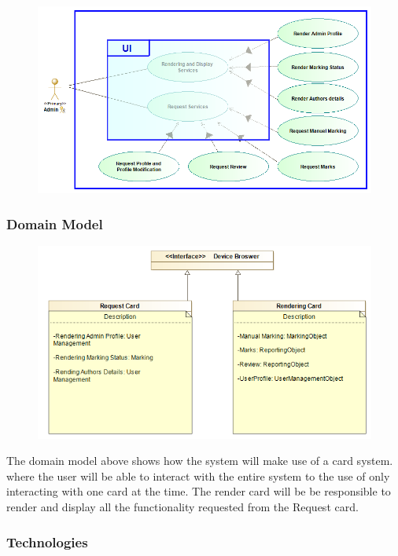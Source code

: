 \documentclass{article}
\begin{document}
			 \begin{figure}[H]
			\centering
				\includegraphics[width=450px]{Images/Access_Module/Pictures/Access_module_Use_Case_diagram}
			\end{figure}
		\subsubsection{Domain Model}
			\begin{figure}[H]
			\centering
				\includegraphics[width=450px]{Images/Access_Module/Pictures/Access_module_Class_diagram}
			\end{figure}
			
			\par The domain model above shows how the system will make use of a card system. where the user will be able 
			to interact with the entire system to the use of only interacting with one card at the time. The render 
			card will be be responsible to render and display all the functionality requested from the Request card.
		
			
		\subsubsection{Technologies}
\end{document}
